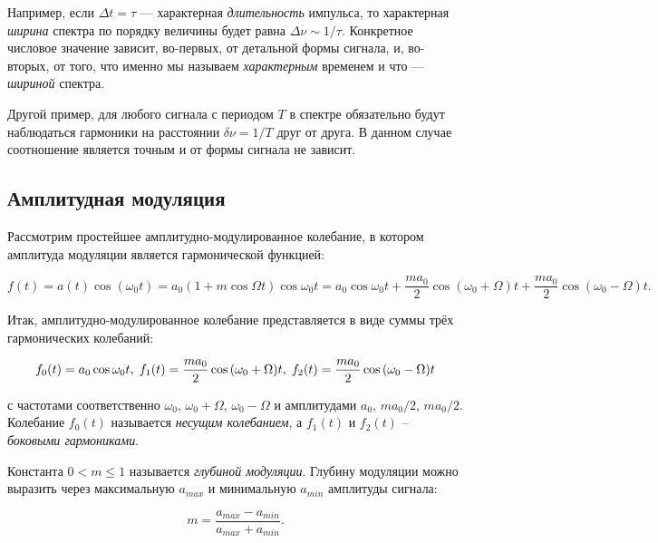 \documentclass[a4paper, 12pt]{article}
\begin{document}
    Например, если $\Delta t = \tau$ — характерная \textit{длительность} импульса, то характерная \textit{ширина} спектра по порядку величины будет равна $\Delta \nu \sim 1/\tau$. Конкретное числовое значение зависит, во-первых, от детальной формы сигнала, и, во-вторых, от того, что именно мы называем \textit{характерным} временем и что — \textit{шириной} спектра.
    
    Другой пример, для любого сигнала с периодом $T$ в спектре обязательно будут наблюдаться гармоники на расстоянии $\delta \nu = 1/T$ друг от друга. В данном случае соотношение является точным и от формы сигнала не зависит.

    \subsection{Амплитудная модуляция}

    Рассмотрим простейшее амплитудно-модулированное колебание, в котором амплитуда модуляции является гармонической функцией:

    \begin{equation}
        f(t) = a(t) \cos{(\omega_0 t)} = a_0 (1 + m \cos{\Omega t}) \cos{\omega_0 t} = a_0 \cos{\omega_0 t} + \frac{ma_0}{2} \cos{(\omega_0 + \Omega) t} + \frac{ma_0}{2} \cos{(\omega_0 - \Omega) t} .
        \label{eq:modulation_f(t)_1}
    \end{equation}

    Итак, амплитудно-модулированное колебание представляется в виде суммы трёх гармонических колебаний:

    \begin{equation}
        f_0(t) = a_0 \cos{\omega_0 t}, \hspace{1 mm} f_1(t) = \frac{ma_0}{2} \cos{(\omega_0 + \Omega) t}, \hspace{1 mm} f_2(t) = \frac{ma_0}{2} \cos{(\omega_0 - \Omega) t}
    \end{equation}

    с частотами соответственно $\omega_0$, $\omega_0 + \Omega$, $\omega_0 - \Omega$ и амплитудами $a_0$, $ma_0/2$, $ma_0/2$. Колебание $f_0(t)$ называется \textit{несущим колебанием}, а $f_1(t)$ и $f_2(t)$ -- \textit{боковыми гармониками}.

    Константа $0 < m \leq 1$ называется \textit{глубиной модуляции}. Глубину модуляции можно выразить через максимальную $a_{max}$ и минимальную $a_{min}$ амплитуды сигнала:

    \begin{equation}
        m = \frac{a_{max} - a_{min}}{a_{max} + a_{min}}.
    \end{equation}
\end{document}
